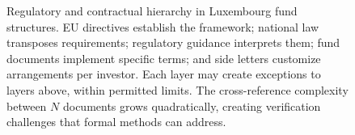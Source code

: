 \begin{figure}[t]
\caption{Regulatory and contractual hierarchy in Luxembourg fund structures. EU directives establish the framework; national law transposes requirements; regulatory guidance interprets them; fund documents implement specific terms; and side letters customize arrangements per investor. Each layer may create exceptions to layers above, within permitted limits. The cross-reference complexity between $N$ documents grows quadratically, creating verification challenges that formal methods can address.}
\label{fig:hierarchy}
\end{figure}
